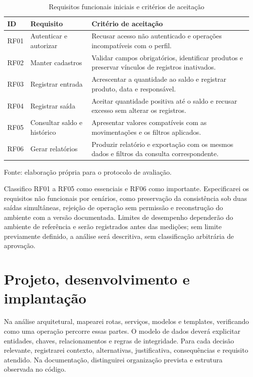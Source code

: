 \begin{table}[htb]
\centering
\caption{Requisitos funcionais iniciais e critérios de aceitação}
\label{tab:requisitos}
\small
\begin{tabular}{p{}p{}p{}}
\hline
\textbf{ID} & \textbf{Requisito} & \textbf{Critério de aceitação} \\ \hline
RF01 & Autenticar e autorizar & Recusar acesso não autenticado e operações incompatíveis com o perfil. \\ \hline
RF02 & Manter cadastros & Validar campos obrigatórios, identificar produtos e preservar vínculos de registros inativados. \\ \hline
RF03 & Registrar entrada & Acrescentar a quantidade ao saldo e registrar produto, data e responsável. \\ \hline
RF04 & Registrar saída & Aceitar quantidade positiva até o saldo e recusar excesso sem alterar os registros. \\ \hline
RF05 & Consultar saldo e histórico & Apresentar valores compatíveis com as movimentações e os filtros aplicados. \\ \hline
RF06 & Gerar relatórios & Produzir relatório e exportação com os mesmos dados e filtros da consulta correspondente. \\ \hline
\end{tabular}
\par\smallskip
{\footnotesize Fonte: elaboração própria para o protocolo de avaliação.}
\end{table}

Classifico RF01 a RF05 como essenciais e RF06 como importante. Especificarei os requisitos não funcionais por cenários, como preservação da consistência sob duas saídas simultâneas, rejeição de operação sem permissão e reconstrução do ambiente com a versão documentada. Limites de desempenho dependerão do ambiente de referência e serão registrados antes das medições; sem limite previamente definido, a análise será descritiva, sem classificação arbitrária de aprovação.

\section{Projeto, desenvolvimento e implantação}

Na análise arquitetural, mapearei rotas, serviços, modelos e templates, verificando como uma operação percorre essas partes. O modelo de dados deverá explicitar entidades, chaves, relacionamentos e regras de integridade. Para cada decisão relevante, registrarei contexto, alternativas, justificativa, consequências e requisito atendido. Na documentação, distinguirei organização prevista e estrutura observada no código.

